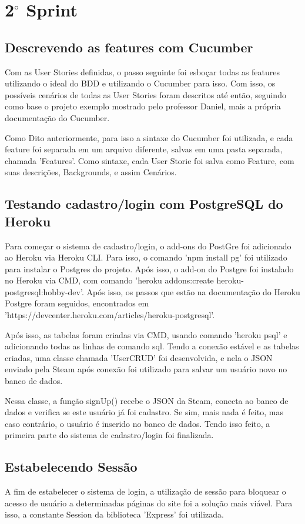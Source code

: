 \section{2$^{\circ}$ Sprint}
\subsection{Descrevendo as features com Cucumber}
Com as User Stories definidas, o passo seguinte foi esboçar todas as features utilizando o ideal do BDD 
e utilizando o Cucumber para isso. Com isso, os possíveis cenários de todas as User Stories foram descritos até então, seguindo como base o projeto exemplo mostrado pelo professor Daniel, 
mais a própria documentação do Cucumber.

Como Dito anteriormente, para isso a sintaxe do Cucumber foi utilizada, e cada feature foi separada em um arquivo diferente, 
salvas em uma pasta separada, chamada 'Features'. 
Como sintaxe, cada User Storie foi salva como Feature, com suas descrições, Backgrounds, e assim Cenários.

\subsection{Testando cadastro/login com PostgreSQL do Heroku}
Para começar o sistema de cadastro/login, o add-ons do PostGre foi adicionado ao Heroku via Heroku CLI. Para isso, 
o comando 'npm install pg' foi utilizado para instalar o Postgres do projeto. Após isso, o add-on do Postgre foi instalado no
Heroku via CMD, com comando 'heroku addons:create heroku-postgresql:hobby-dev'. Após isso, os passos 
que estão na documentação do Heroku Postgre foram seguidos, encontrados em 'https://devcenter.heroku.com/articles/heroku-postgresql'.

Após isso, as tabelas foram criadas via CMD, usando comando 'heroku psql' e adicionando todas as linhas de comando sql.
Tendo a conexão estável e as tabelas criadas, uma classe chamada 'UserCRUD' foi desenvolvida, e nela o JSON 
enviado pela Steam após conexão foi utilizado para salvar um usuário novo no banco de dados.

Nessa classe, a função signUp() recebe o JSON da Steam, conecta ao banco de dados e verifica se este usuário 
já foi cadastro. Se sim, mais nada é feito, mas caso contrário, o usuário é inserido no banco de dados.
Tendo isso feito, a primeira parte do sistema de cadastro/login foi finalizada.

\subsection{Estabelecendo Sessão}
A fim de estabelecer o sistema de login, a utilização de sessão para bloquear o acesso de usuário a 
determinadas páginas do site foi a solução mais viável. Para isso, a constante Session da biblioteca 'Express' foi utilizada.


